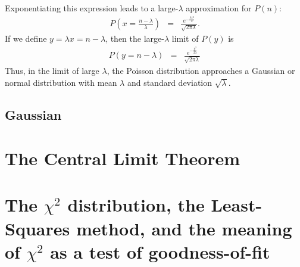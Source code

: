 \documentclass{revtex4}
\begin{document}
Exponentiating this expression leads to a large-$\lambda$
approximation for $P(n)$:
\begin{eqnarray}
  P\left(x = \frac{n-\lambda}{\lambda}\right) &=& \frac{e^{-\frac{\lambda
        x^2}{2}}}{\sqrt{2\pi \lambda}}.
\end{eqnarray}
If we define $y = \lambda x = n - \lambda$, then the large-$\lambda$ limit
of $P(y)$ is 
\begin{eqnarray}
  P(y = n - \lambda) &=& \frac{e^{-\frac{y^2}{2\lambda}}}{\sqrt{2\pi \lambda}}
\end{eqnarray}
Thus, in the limit of large $\lambda$, the Poisson distribution
approaches a Gaussian or normal distribution with mean $\lambda$
and standard deviation $\sqrt{\lambda}$.
\subsection{Gaussian}
\section{The Central Limit Theorem}
\section{The $\chi^2$ distribution, the Least-Squares method, and the
  meaning of $\chi^2$ as a test of goodness-of-fit}
\end{document}
